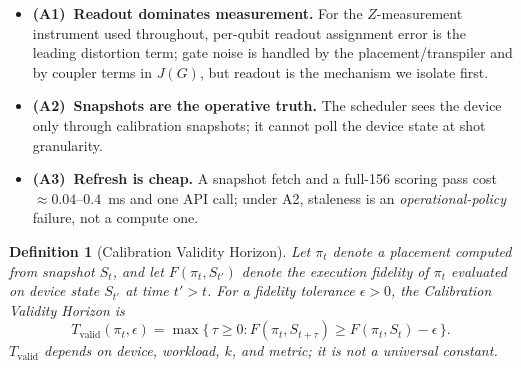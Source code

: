 \documentclass[journal,10pt,twocolumn]{IEEEtran}
\newtheorem{definition}{Definition}
\begin{document}
\begin{itemize}[leftmargin=1.1em,itemsep=1pt,topsep=2pt]
\item \textbf{(A1)~Readout dominates measurement.} For the $Z$-measurement instrument used throughout, per-qubit
readout assignment error is the leading distortion term; gate noise is handled by the placement/transpiler and by
coupler terms in $J(G)$, but readout is the mechanism we isolate first.
\item \textbf{(A2)~Snapshots are the operative truth.} The scheduler sees the device only through calibration
snapshots; it cannot poll the device state at shot granularity.
\item \textbf{(A3)~Refresh is cheap.} A snapshot fetch and a full-156 scoring pass cost $\approx0.04$--$0.4$~ms and
one API call; under A2, staleness is an \emph{operational-policy} failure, not a compute one.
\end{itemize}

\begin{definition}[Calibration Validity Horizon]
\label{def:tvalid}
Let $\pi_t$ denote a placement computed from snapshot $S_t$, and let $F(\pi_t, S_{t'})$ denote the execution
fidelity of $\pi_t$ evaluated on device state $S_{t'}$ at time $t' > t$. For a fidelity tolerance
$\epsilon > 0$, the \emph{Calibration Validity Horizon} is
\begin{equation}
T_{\mathrm{valid}}(\pi_t, \epsilon) = \max\{\,\tau \ge 0 : F(\pi_t, S_{t+\tau}) \ge F(\pi_t, S_t) - \epsilon\,\}.
\label{eq:tvalid}
\end{equation}
$T_{\mathrm{valid}}$ depends on device, workload, $k$, and metric; it is not a universal constant.
\end{definition}
\end{document}
